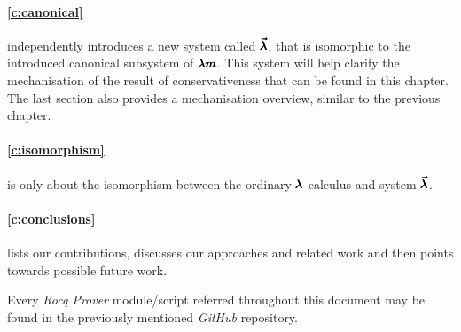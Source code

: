 \paragraph{\cref{c:canonical}} independently introduces a new system called $\pmb{\vec \lambda}$, that is isomorphic to the introduced canonical subsystem of $\pmb{\lambda m}$.
This system will help clarify the mechanisation of the result of conservativeness that can be found in this chapter.
The last section also provides a mechanisation overview, similar to the previous chapter.

\paragraph{\cref{c:isomorphism}} is only about the isomorphism between the ordinary $\pmb{\lambda}$-calculus and system $\pmb{\vec \lambda}$.

\paragraph{\cref{c:conclusions}} lists our contributions, discusses our approaches and related work and then points towards possible future work.

Every \textit{Rocq Prover} module/script referred throughout this document may be found in the previously mentioned \textit{GitHub} repository.


